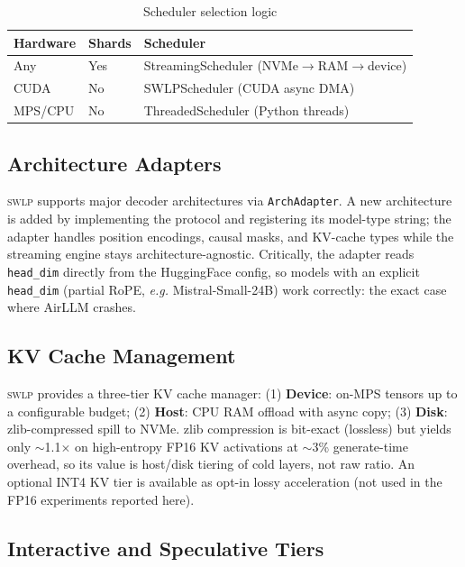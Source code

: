 \documentclass[10pt,a4paper]{article}
\newcommand{\swlp}{\textsc{swlp}}
\newcommand{\eg}{\textit{e.g.}}
\begin{document}
\begin{table}[htbp]
\centering
\caption{Scheduler selection logic}
\label{tab:schedulers}
\begin{tabular}{@{}lll@{}}
\toprule
\textbf{Hardware} & \textbf{Shards} & \textbf{Scheduler} \\
\midrule
Any & Yes & StreamingScheduler (NVMe$\rightarrow$RAM$\rightarrow$device) \\
CUDA & No & SWLPScheduler (CUDA async DMA) \\
MPS/CPU & No & ThreadedScheduler (Python threads) \\
\bottomrule
\end{tabular}
\end{table}

\subsection{Architecture Adapters}
\label{subsec:adapters}

\swlp{} supports major decoder architectures via \texttt{ArchAdapter}. A new
architecture is added by implementing the protocol and registering its model-type
string; the adapter handles position encodings, causal masks, and KV-cache types
while the streaming engine stays architecture-agnostic. Critically, the adapter
reads \texttt{head\_dim} directly from the HuggingFace config, so models with an
explicit \texttt{head\_dim} (partial RoPE, \eg{} Mistral-Small-24B) work
correctly: the exact case where AirLLM crashes.

\subsection{KV Cache Management}
\label{subsec:kv}

\swlp{} provides a three-tier KV cache manager: (1) \textbf{Device}: on-MPS
tensors up to a configurable budget; (2) \textbf{Host}: CPU RAM offload with
async copy; (3) \textbf{Disk}: zlib-compressed spill to NVMe. zlib compression
is bit-exact (lossless) but yields only $\sim$1.1$\times$ on high-entropy FP16 KV
activations at $\sim$3\% generate-time overhead, so its value is host/disk tiering
of cold layers, not raw ratio. An optional INT4 KV tier is available as opt-in
lossy acceleration (not used in the FP16 experiments reported here).

\subsection{Interactive and Speculative Tiers}
\label{subsec:tiers}
\end{document}
